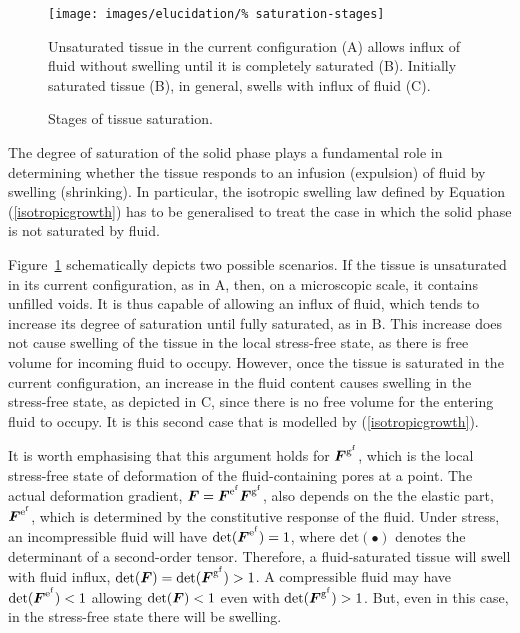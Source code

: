 \begin{figure}[ht]
  \begin{center}
    \texttt{[image: images/elucidation/\%
      saturation-stages]}
    \caption{Stages of tissue saturation.}
    \label{saturation-and-swelling}
  \end{center}
      {Unsaturated tissue in the current configuration (A) allows
        influx of fluid without swelling until it is completely
        saturated (B). Initially saturated tissue (B), in general,
        swells with influx of fluid (C).}
\end{figure}

\noindent The degree of saturation of the solid phase plays a
fundamental role in determining whether the tissue responds to an
infusion (expulsion) of fluid by swelling (shrinking). In particular,
the isotropic swelling law defined by Equation (\ref{isotropicgrowth})
has to be generalised to treat the case in which the solid phase is
not saturated by fluid.

Figure~\ref{saturation-and-swelling} schematically depicts two
possible scenarios. If the tissue is unsaturated in its current
configuration, as in A, then, on a microscopic scale, it contains
unfilled voids. It is thus capable of allowing an influx of fluid,
which tends to increase its degree of saturation until fully
saturated, as in B. This increase does not cause swelling of the
tissue in the local stress-free state, as there is free volume for
incoming fluid to occupy. However, once the tissue is saturated in the
current configuration, an increase in the fluid content causes
swelling in the stress-free state, as depicted in C, since there is no
free volume for the entering fluid to occupy. It is this second case
that is modelled by (\ref{isotropicgrowth}).

It is worth emphasising that this argument holds for
$\mbox{\boldmath$ F$}^{\mathrm{g}^\mathrm{f}}$, which is the local stress-free state of
deformation of the fluid-containing pores at a point. The actual
deformation gradient, $\mbox{\boldmath$ F$} =
\mbox{\boldmath$ F$}^{\mathrm{e}^\mathrm{f}}\mbox{\boldmath$ F$}^{\mathrm{g}^\mathrm{f}}$, also depends
on the the elastic part, $\mbox{\boldmath$ F$}^{\mathrm{e}^\mathrm{f}}$, which is
determined by the constitutive response of the fluid. Under stress, an
incompressible fluid will have
$\mathrm{det}(\mbox{\boldmath$ F$}^{\mathrm{e}^\mathrm{f}}) = 1$, where
$\mathrm{det}(\bullet)$ denotes the determinant of a second-order
tensor. Therefore, a fluid-saturated tissue will swell with fluid
influx, \mbox{$\mathrm{det}(\mbox{\boldmath$ F$}) =
  \mathrm{det}(\mbox{\boldmath$ F$}^{\mathrm{g}^\mathrm{f}}) > 1$}. A compressible
fluid may have 
$\mathrm{det}(\mbox{\boldmath$ F$}^{\mathrm{e}^\mathrm{f}}) < 1$ allowing
$\mathrm{det}(\mbox{\boldmath$ F$}) < 1$ even with
$\mathrm{det}(\mbox{\boldmath$ F$}^{\mathrm{g}^\mathrm{f}}) >1$. But, even in this case,
in the stress-free state there will be swelling.

